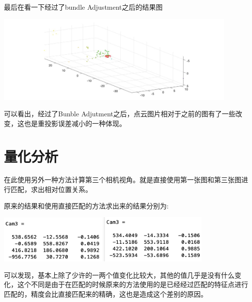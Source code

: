 最后在看一下经过了bundle Adjustment之后的结果图
\begin{center}
    \includegraphics[width=0.9\textwidth]{figures/bundleadjustment.jpg}
\end{center}
可以看出，经过了Bunble Adjutment之后，点云图片相对于之前的图有了一些改变，这也是重投影误差减小的一种体现。



\section{量化分析}
在此使用另外一种方法计算第三个相机视角。就是直接使用第一张图和第三张图进行匹配，求出相对位置关系。

原来的结果和使用直接匹配的方法求出来的结果分别为:
\begin{center}
    \includegraphics[width=0.4\textwidth]{figures/test1.png}
    \includegraphics[width=0.4\textwidth]{figures/test2.png}
\end{center}
可以发现，基本上除了少许的一两个值变化比较大，其他的值几乎是没有什么变化，这个不同是由于在匹配的时候原来的方法使用的是已经经过匹配的特征点进行匹配的，精度会比直接匹配来的精确，这也是造成这个差别的原因。

